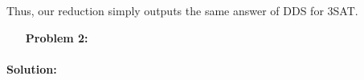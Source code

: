 \documentclass{amsart}
\theoremstyle{plain}
\begin{document}
Thus, our reduction simply outputs the same answer of DDS for 3SAT.

\begin{enumerate}
\item[\textbf{Problem 2:}] %
\end{enumerate}
\paragraph{\textbf{Solution:}}
\end{document}
